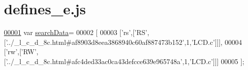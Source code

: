 \hypertarget{defines__e_8js_source}{}\section{defines\+\_\+e.\+js}
\label{defines__e_8js_source}

\begin{DoxyCode}
\hypertarget{defines__e_8js_source.tex_l00001}{}\hyperlink{defines__e_8js_ad01a7523f103d6242ef9b0451861231e}{00001} var \hyperlink{defines__e_8js_ad01a7523f103d6242ef9b0451861231e}{searchData}=
00002 [
00003   [\textcolor{stringliteral}{'rs'},[\textcolor{stringliteral}{'RS'},[\textcolor{stringliteral}{'../\_l\_c\_d\_8c.html#af8903d8eea3868940c60af887473b152'},1,\textcolor{stringliteral}{'LCD.c'}]]],
00004   [\textcolor{stringliteral}{'rw'},[\textcolor{stringliteral}{'RW'},[\textcolor{stringliteral}{'../\_l\_c\_d\_8c.html#afc4ded33ac0ca43defcce639e965748a'},1,\textcolor{stringliteral}{'LCD.c'}]]]
00005 ];
\end{DoxyCode}

